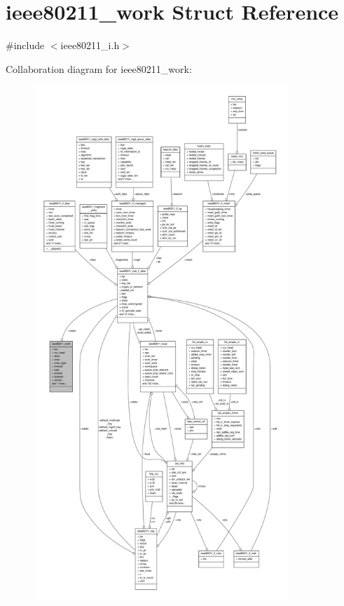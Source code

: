 \hypertarget{structieee80211__work}{\section{ieee80211\-\_\-work Struct Reference}
\label{structieee80211__work}
}


{\ttfamily \#include $<$ieee80211\-\_\-i.\-h$>$}



Collaboration diagram for ieee80211\-\_\-work\-:
\nopagebreak
\begin{figure}[H]
\begin{center}
\leavevmode
\includegraphics[height=550pt]{structieee80211__work__coll__graph}
\end{center}
\end{figure}

